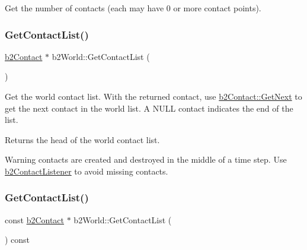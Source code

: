 Get the number of contacts (each may have 0 or more contact points). 

\mbox{\label{classb2_world_ab1e1c59fd7534c0268c2a3e31370a425}} 
\subsubsection{\texorpdfstring{GetContactList()}{GetContactList()}\hspace{0.1cm}{\footnotesize\ttfamily [1/2]}}
{\footnotesize\ttfamily \mbox{\hyperlink{classb2_contact}{b2\+Contact}} $\ast$ b2\+World\+::\+Get\+Contact\+List (\begin{DoxyParamCaption}{ }\end{DoxyParamCaption})\hspace{0.3cm}{\ttfamily [inline]}}

Get the world contact list. With the returned contact, use \mbox{\hyperlink{classb2_contact_aebfebb1e4b27dc0bd7aa120093e3d650}{b2\+Contact\+::\+Get\+Next}} to get the next contact in the world list. A N\+U\+LL contact indicates the end of the list. \begin{DoxyReturn}{Returns}
the head of the world contact list. 
\end{DoxyReturn}
\begin{DoxyWarning}{Warning}
contacts are created and destroyed in the middle of a time step. Use \mbox{\hyperlink{classb2_contact_listener}{b2\+Contact\+Listener}} to avoid missing contacts. 
\end{DoxyWarning}
\mbox{\label{classb2_world_a8a947dbda196b037b922d62e6a54062f}} 
\subsubsection{\texorpdfstring{GetContactList()}{GetContactList()}\hspace{0.1cm}{\footnotesize\ttfamily [2/2]}}
{\footnotesize\ttfamily const \mbox{\hyperlink{classb2_contact}{b2\+Contact}} $\ast$ b2\+World\+::\+Get\+Contact\+List (\begin{DoxyParamCaption}{ }\end{DoxyParamCaption}) const\hspace{0.3cm}{\ttfamily [inline]}}

